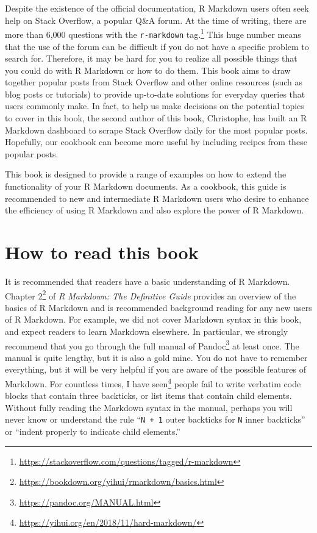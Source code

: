 \documentclass[
  11pt,
]{krantz}
\renewcommand{\href}[2]{#2\footnote{\url{#1}}}
\begin{document}
Despite the existence of the official documentation, R Markdown users often seek help on Stack Overflow, a popular Q\&A forum. At the time of writing, there are more than 6,000 questions with \href{https://stackoverflow.com/questions/tagged/r-markdown}{the \texttt{r-markdown} tag.} This huge number means that the use of the forum can be difficult if you do not have a specific problem to search for. Therefore, it may be hard for you to realize all possible things that you could do with R Markdown or how to do them. This book aims to draw together popular posts from Stack Overflow and other online resources (such as blog posts or tutorials) to provide up-to-date solutions for everyday queries that users commonly make. In fact, to help us make decisions on the potential topics to cover in this book, the second author of this book, Christophe, has built an R Markdown dashboard to scrape Stack Overflow daily for the most popular posts. Hopefully, our cookbook can become more useful by including recipes from these popular posts.

This book is designed to provide a range of examples on how to extend the functionality of your R Markdown documents. As a cookbook, this guide is recommended to new and intermediate R Markdown users who desire to enhance the efficiency of using R Markdown and also explore the power of R Markdown.

\hypertarget{how-to-read-this-book}{%
\section*{How to read this book}\label{how-to-read-this-book}}


It is recommended that readers have a basic understanding of R Markdown. \href{https://bookdown.org/yihui/rmarkdown/basics.html}{Chapter 2} of \emph{R Markdown: The Definitive Guide} \citep{rmarkdown2018} provides an overview of the basics of R Markdown and is recommended background reading for any new users of R Markdown. For example, we did not cover Markdown syntax in this book, and expect readers to learn Markdown elsewhere. In particular, we strongly recommend that you go through \href{https://pandoc.org/MANUAL.html}{the full manual of Pandoc} at least once. The manual is quite lengthy, but it is also a gold mine. You do not have to remember everything, but it will be very helpful if you are aware of the possible features of Markdown. \href{https://yihui.org/en/2018/11/hard-markdown/}{For countless times, I have seen} people fail to write verbatim code blocks that contain three backticks, or list items that contain child elements. Without fully reading the Markdown syntax in the manual, perhaps you will never know or understand the rule ``\texttt{N + 1} outer backticks for \texttt{N} inner backticks'' or ``indent properly to indicate child elements.''
\end{document}
